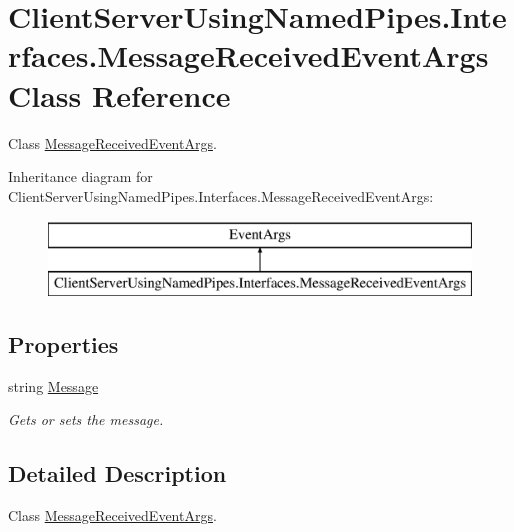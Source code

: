 \hypertarget{class_client_server_using_named_pipes_1_1_interfaces_1_1_message_received_event_args}{}\section{Client\+Server\+Using\+Named\+Pipes.\+Interfaces.\+Message\+Received\+Event\+Args Class Reference}
\label{class_client_server_using_named_pipes_1_1_interfaces_1_1_message_received_event_args}


Class \hyperlink{class_client_server_using_named_pipes_1_1_interfaces_1_1_message_received_event_args}{Message\+Received\+Event\+Args}.  


Inheritance diagram for Client\+Server\+Using\+Named\+Pipes.\+Interfaces.\+Message\+Received\+Event\+Args\+:\begin{figure}[H]
\begin{center}
\leavevmode
\includegraphics[height=2.000000cm]{class_client_server_using_named_pipes_1_1_interfaces_1_1_message_received_event_args}
\end{center}
\end{figure}
\subsection*{Properties}
\begin{DoxyCompactItemize}
\item 
string \hyperlink{class_client_server_using_named_pipes_1_1_interfaces_1_1_message_received_event_args_abf95715ee9354dc8f891b9917c00e5e4}{Message}
\begin{DoxyCompactList}\small\item\em Gets or sets the message. \end{DoxyCompactList}\end{DoxyCompactItemize}


\subsection{Detailed Description}
Class \hyperlink{class_client_server_using_named_pipes_1_1_interfaces_1_1_message_received_event_args}{Message\+Received\+Event\+Args}. 

